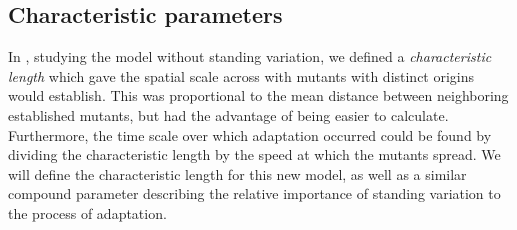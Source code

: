 \documentclass{article}
\begin{document}

\subsection{Characteristic parameters}


In \citet{ralph2010parallel}, studying the model without standing variation,
we defined a {\em characteristic length} which gave the spatial scale across with mutants with distinct origins would establish.
This was proportional to the mean distance between neighboring established mutants,
but had the advantage of being easier to calculate.
Furthermore, the time scale over which adaptation occurred could be found by dividing the characteristic length 
by the speed at which the mutants spread.
We will define the characteristic length for this new model,
as well as a similar compound parameter describing the relative importance of standing variation to the process of adaptation.
\end{document}
